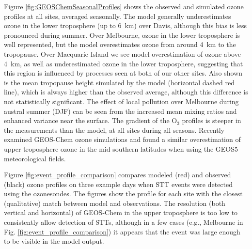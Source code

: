 \documentclass[acp, manuscript]{copernicus} %
\begin{document}
  Figure \ref{fig:GEOSChemSeasonalProfiles} shows the observed and simulated ozone profiles at all sites, averaged seasonally.
  The model generally underestimates ozone in the lower troposphere (up to 6~km) over Davis, although this bias is less pronounced during summer.
  Over Melbourne, ozone in the lower troposphere is well represented, but the model overestimates ozone from around 4~km to the tropopause.
  Over Macquarie Island we see model overestimation of ozone above 4~km, as well as underestimated ozone in the lower troposphere, suggesting that this region is influenced by processes seen at both of our other sites.
  Also shown is the mean tropopause height simulated by the model (horizontal dashed red line), which is always higher than the observed average, although this difference is not statistically significant.
  The effect of local pollution over Melbourne during austral summer (DJF) can be seen from the increased mean mixing ratios and enhanced variance near the surface.
  The gradient of the O$_3$ profiles is steeper in the measurements than the model, at all sites during all seasons.
  Recently \cite{Hu2017} examined GEOS-Chem ozone simulations and found a similar overestimation of upper troposphere ozone in the mid southern latitudes when using the GEOS5 meteorological fields.
  
  Figure \ref{fig:event_profile_comparison} compares modeled (red) and observed (black) ozone profiles on three example days when STT events were detected using the ozonesondes. 
  The figures show the profile for each site with the closest (qualitative) match between model and observations.
  The resolution (both vertical and horizontal) of GEOS-Chem in the upper troposphere is too low to consistently allow detection of STTs, although in a few cases (e.g., Melbourne in Fig. \ref{fig:event_profile_comparison}) it appears that the event was large enough to be visible in the model output.
  
\end{document}
